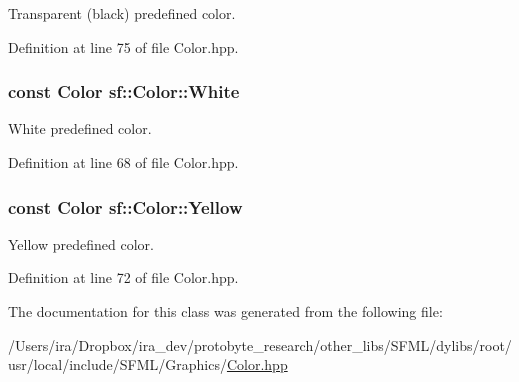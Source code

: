 Transparent (black) predefined color. 



Definition at line 75 of file Color.\-hpp.

\hypertarget{classsf_1_1_color_a4fd874712178d9e206f53226002aa4ca}{
\subsubsection[{White}]{\setlength{\rightskip}{0pt plus 5cm}const {\bf Color} sf\-::\-Color\-::\-White\hspace{0.3cm}{\ttfamily [static]}}}\label{classsf_1_1_color_a4fd874712178d9e206f53226002aa4ca}


White predefined color. 



Definition at line 68 of file Color.\-hpp.

\hypertarget{classsf_1_1_color_af8896b5f56650935f5b9d72d528802c7}{
\subsubsection[{Yellow}]{\setlength{\rightskip}{0pt plus 5cm}const {\bf Color} sf\-::\-Color\-::\-Yellow\hspace{0.3cm}{\ttfamily [static]}}}\label{classsf_1_1_color_af8896b5f56650935f5b9d72d528802c7}


Yellow predefined color. 



Definition at line 72 of file Color.\-hpp.



The documentation for this class was generated from the following file\-:\begin{DoxyCompactItemize}
\item 
/\-Users/ira/\-Dropbox/ira\-\_\-dev/protobyte\-\_\-research/other\-\_\-libs/\-S\-F\-M\-L/dylibs/root/usr/local/include/\-S\-F\-M\-L/\-Graphics/\hyperlink{_color_8hpp}{Color.\-hpp}\end{DoxyCompactItemize}
